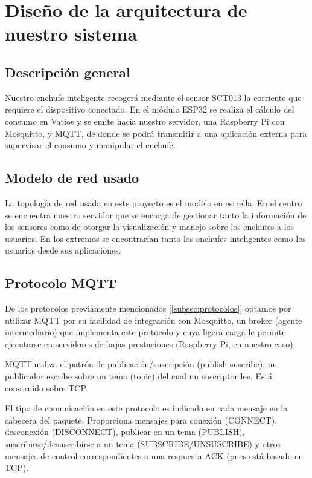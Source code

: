 \documentclass[a4paper,10pt]{article}
\begin{document}
\newpage

\section{Diseño de la arquitectura de nuestro
sistema}\label{diseuxf1o-de-la-arquitectura-de-nuestro-sistema}

\subsection{Descripción general}\label{descripciuxf3n-general}

Nuestro enchufe inteligente recogerá mediante el sensor SCT013 la
corriente que requiere el dispositivo conectado. En el módulo ESP32 se
realiza el cálculo del consumo en Vatios y se emite hacia nuestro
servidor, una Raspberry Pi con Mosquitto, y MQTT, de donde se podrá
transmitir a una aplicación externa para supervisar el consumo y
manipular el enchufe.

\subsection{Modelo de red usado}\label{modelo-de-red-usado}

La topología de red usada en este proyecto es el modelo en
estrella. En el centro se encuentra nuestro servidor que se encarga de
gestionar tanto la información de los sensores como de otorgar la
visualización y manejo sobre los enchufes a los usuarios. En los
extremos se encontrarían tanto los enchufes inteligentes como los
usuarios desde sus aplicaciones.

\subsection{Protocolo MQTT}\label{protocolo-mqtt}

De los protocolos previamente mencionados [\ref{subsec:protocolos}]
optamos por utilizar MQTT por su facilidad de integración con
Mosquitto, un broker (agente intermediario) que implementa este
protocolo y cuya ligera carga le permite ejecutarse en servidores de
bajas prestaciones (Raspberry Pi, en nuestro caso).

MQTT utiliza el patrón de publicación/suscripción (publish-suscribe),
un publicador escribe sobre un tema (topic) del cual un suscriptor
lee. Está construido sobre TCP.

El tipo de comunicación en este protocolo es indicado en cada mensaje
en la cabecera del paquete. Proporciona mensajes para conexión
(CONNECT), desconexión (DISCONNECT), publicar en un tema (PUBLISH),
suscribirse/desuscribirse a un tema (SUBSCRIBE/UNSUSCRIBE) y otros
mensajes de control correspondientes a una respuesta ACK (pues está
basado en TCP)\cite{banksMQTTVersionEdited}.
\end{document}
